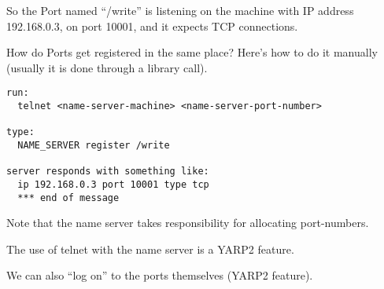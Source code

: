 So the Port named ``/write'' is listening on the machine with
IP address 192.168.0.3, on port 10001, and it expects TCP
connections.

How do Ports get registered in the same place?  Here's how
to do it manually (usually it is done through a library call).

\begin{verbatim}
run:
  telnet <name-server-machine> <name-server-port-number>

type:
  NAME_SERVER register /write

server responds with something like:
  ip 192.168.0.3 port 10001 type tcp
  *** end of message
\end{verbatim}

Note that the name server takes responsibility for allocating
port-numbers.

The use of telnet with the name server is a YARP2 feature.

We can also ``log on'' to the ports themselves (YARP2 feature).

